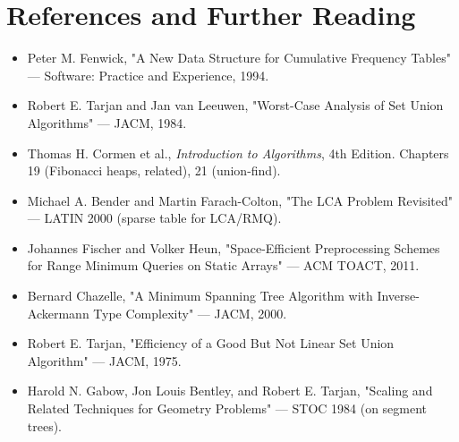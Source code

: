 \section{References and Further Reading}

\begin{itemize}
\item Peter M. Fenwick, "A New Data Structure for Cumulative Frequency Tables" — Software: Practice and Experience, 1994.
\item Robert E. Tarjan and Jan van Leeuwen, "Worst-Case Analysis of Set Union Algorithms" — JACM, 1984.
\item Thomas H. Cormen et al., \textit{Introduction to Algorithms}, 4th Edition. Chapters 19 (Fibonacci heaps, related), 21 (union-find).
\item Michael A. Bender and Martin Farach-Colton, "The LCA Problem Revisited" — LATIN 2000 (sparse table for LCA/RMQ).
\item Johannes Fischer and Volker Heun, "Space-Efficient Preprocessing Schemes for Range Minimum Queries on Static Arrays" — ACM TOACT, 2011.
\item Bernard Chazelle, "A Minimum Spanning Tree Algorithm with Inverse-Ackermann Type Complexity" — JACM, 2000.
\item Robert E. Tarjan, "Efficiency of a Good But Not Linear Set Union Algorithm" — JACM, 1975.
\item Harold N. Gabow, Jon Louis Bentley, and Robert E. Tarjan, "Scaling and Related Techniques for Geometry Problems" — STOC 1984 (on segment trees).
\end{itemize}


